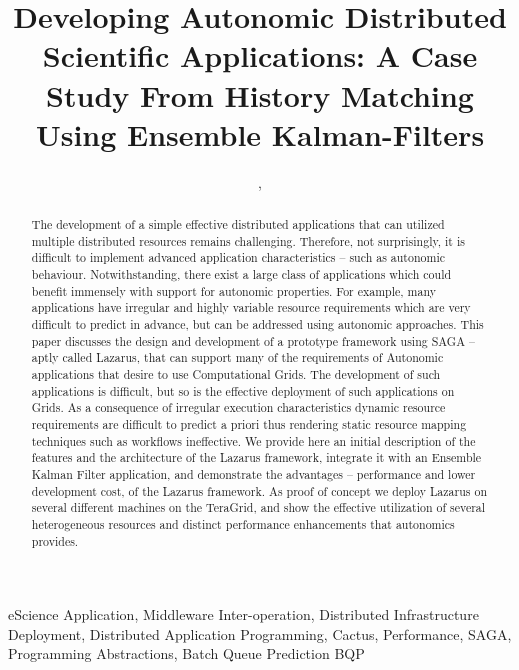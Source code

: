 \documentclass[conference,final]{IEEEtran}
\begin{document}
\title{\large Developing Autonomic Distributed Scientific
  Applications: A Case Study From History Matching Using Ensemble
  Kalman-Filters}
  
\author{,
    
}
\maketitle
 \begin{abstract}
   The development of a simple effective distributed applications that
   can utilized multiple distributed resources remains challenging.
   Therefore, not surprisingly, it is difficult to implement advanced
   application characteristics -- such as autonomic
   behaviour. Notwithstanding, there exist a large class of
   applications which could benefit immensely with support for
   autonomic properties.  For example, many applications have
   irregular and highly variable resource requirements which are very
   difficult to predict in advance, but can be addressed using
   autonomic approaches.  This paper discusses the design and
   development of a prototype framework using SAGA -- aptly called
   Lazarus, that can support many of the requirements of Autonomic
   applications that desire to use Computational Grids.  The
   development of such applications is difficult, but so is the
   effective deployment of such applications on Grids.  As a
   consequence of irregular execution characteristics dynamic resource
   requirements are difficult to predict a priori thus rendering
   static resource mapping techniques such as workflows ineffective.
   We provide here an initial description of the features and the
   architecture of the Lazarus framework, integrate it with an
   Ensemble Kalman Filter application, and demonstrate the advantages
   -- performance and lower development cost, of the Lazarus
   framework.  As proof of concept we deploy Lazarus on several
   different machines on the TeraGrid, and show the effective
   utilization of several heterogeneous resources and distinct
   performance enhancements that autonomics provides.
 \end{abstract}
 \begin{keywords}
   eScience Application, Middleware Inter-operation, Distributed
   Infrastructure Deployment, Distributed Application Programming,
   Cactus, Performance, SAGA, Programming Abstractions, Batch Queue
   Prediction BQP
 \end{keywords}
\end{document}
